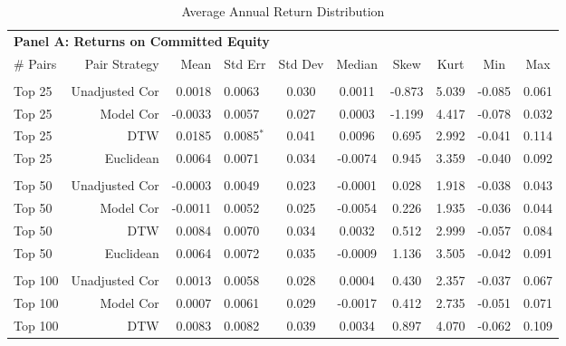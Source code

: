 \begin{table}[hp]
    \centering
    \fontsize{10pt}{10pt}\selectfont
    \begin{threeparttable}
        \caption{Average Annual Return Distribution}    \label{tbl:PairsTradingReturns}
        \begin{tabular}{l r r l c c c c c c}
            \multicolumn{9}{l}{\textbf{Panel A: Returns on Committed Equity}} \\
            \# Pairs & Pair Strategy & Mean & Std Err & Std Dev & Median & Skew & Kurt & Min & Max \\
            \hline
            \vspace{-1mm} \\
            Top 25    & Unadjusted Cor &  0.0018 & 0.0063          & 0.030 &  0.0011 & -0.873 & 5.039 & -0.085 & 0.061 \\
            Top 25    & Model Cor      & -0.0033 & 0.0057          & 0.027 &  0.0003 & -1.199 & 4.417 & -0.078 & 0.032 \\
            Top 25    & DTW            &  0.0185 & 0.0085{$^{*}$}  & 0.041 &  0.0096 &  0.695 & 2.992 & -0.041 & 0.114 \\
            Top 25    & Euclidean      &  0.0064 & 0.0071          & 0.034 & -0.0074 &  0.945 & 3.359 & -0.040 & 0.092 \\
            \vspace{-1mm} \\
            Top 50    & Unadjusted Cor & -0.0003 & 0.0049          & 0.023 & -0.0001 &  0.028 & 1.918 & -0.038 & 0.043 \\
            Top 50    & Model Cor      & -0.0011 & 0.0052          & 0.025 & -0.0054 &  0.226 & 1.935 & -0.036 & 0.044 \\
            Top 50    & DTW            &  0.0084 & 0.0070          & 0.034 &  0.0032 &  0.512 & 2.999 & -0.057 & 0.084 \\
            Top 50    & Euclidean      &  0.0064 & 0.0072          & 0.035 & -0.0009 &  1.136 & 3.505 & -0.042 & 0.091 \\
            \vspace{-1mm} \\
            Top 100   & Unadjusted Cor &  0.0013 & 0.0058          & 0.028 &  0.0004 &  0.430 & 2.357 & -0.037 & 0.067 \\
            Top 100   & Model Cor      &  0.0007 & 0.0061          & 0.029 & -0.0017 &  0.412 & 2.735 & -0.051 & 0.071 \\
            Top 100   & DTW            &  0.0083 & 0.0082          & 0.039 &  0.0034 &  0.897 & 4.070 & -0.062 & 0.109 \\

\end{tabular}
\end{threeparttable}
\end{table}
